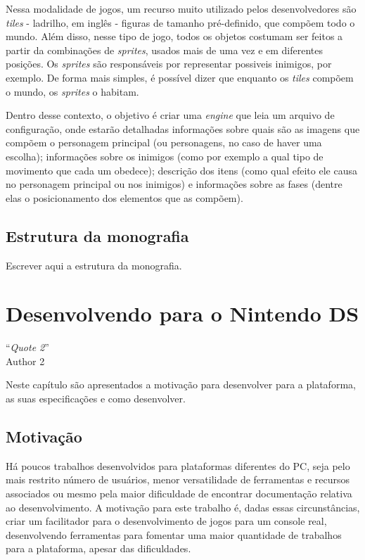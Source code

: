\documentclass[brazil]{abnt}
\begin{document}
Nessa modalidade de jogos, um recurso muito utilizado pelos desenvolvedores são \textit{tiles} - ladrilho, em inglês - figuras de tamanho pré-definido, que compõem todo o mundo. Além disso, nesse tipo de jogo, todos os objetos costumam ser feitos a partir da combinações de \textit{sprites}, usados mais de uma vez e em diferentes posições. Os \textit{sprites} são responsáveis por representar possiveis inimigos, por exemplo. De forma mais simples, é possível dizer que enquanto os \textit{tiles} compõem o mundo, os \textit{sprites} o habitam.

Dentro desse contexto, o objetivo é criar uma \textit{engine} que leia um arquivo de configuração, onde estarão detalhadas informações sobre quais são as imagens que compõem o personagem principal (ou personagens, no caso de haver uma escolha); informações sobre os inimigos (como por exemplo a qual tipo de movimento que cada um obedece); descrição dos itens (como qual efeito ele causa no personagem principal ou nos inimigos) e informações sobre as fases (dentre elas o posicionamento dos elementos que as compõem).

\section{Estrutura da monografia}

Escrever aqui a estrutura da monografia.

\chapter{Desenvolvendo para o Nintendo DS\label{cap:hardds}}

\vfill{}
\begin{flushright}{}``\emph{Quote 2}''\\
{\small Author 2}\end{flushright}{\small \par}
\vfill{}

Neste capítulo são apresentados a motivação para desenvolver para a plataforma, as suas especificações e como desenvolver.
\newpage

\section{Motivação}

Há poucos trabalhos desenvolvidos para plataformas diferentes do PC, seja pelo mais restrito número de usuários, menor versatilidade de ferramentas e recursos associados ou mesmo pela maior dificuldade de encontrar documentação relativa ao desenvolvimento. A motivação para este trabalho é, dadas essas circunstâncias, criar um facilitador para o desenvolvimento de jogos para um console real, desenvolvendo ferramentas para fomentar uma maior quantidade de trabalhos para a plataforma, apesar das dificuldades.
\end{document}
